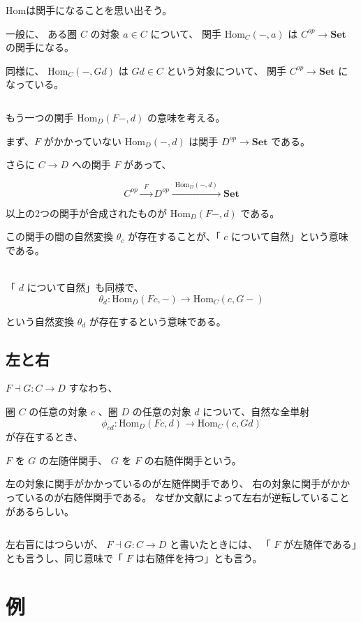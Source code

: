 \documentclass[uplatex,a4j,12pt,dvipdfmx]{jsarticle}
\begin{document}
Homは関手になることを思い出そう。

一般に、
ある圏 $C$ の対象 $a \in C$ について、
関手 $\mathrm{Hom}_{C}(-,a)$ は $C^{op} \to \mathbf{Set}$ の関手になる。

同様に、
$\mathrm{Hom}_{C}(-,Gd)$
は
$Gd \in C$ という対象について、
関手 $C^{op} \to \mathbf{Set}$ になっている。

${}$

もう一つの関手
$\mathrm{Hom}_{D}(F-,d)$
の意味を考える。

まず、$F$ がかかっていない
$\mathrm{Hom}_{D}(-,d)$
は関手
$D^{op} \to \mathbf{Set}$
である。

さらに $C \to D$ への関手 $F$ があって、

$$
	C^{op} \xrightarrow{ \ \ F \ \ } D^{op} \xrightarrow{ \ \ \mathrm{Hom}_{D}(-,d) \ \ } \mathbf{Set}
$$

以上の2つの関手が合成されたものが
$\mathrm{Hom}_{D}(F-,d)$
である。

この関手の間の自然変換 $\theta_{c}$ が存在することが、「 $c$ について自然」という意味である。

\ \\

「 $d$ について自然」も同様で、
$$
	\theta_{d} : \mathrm{Hom}_{D}(Fc,-) \to \mathrm{Hom}_{C}(c,G-)
$$

という自然変換 $\theta_{d}$ が存在するという意味である。


\subsection{左と右}

$F \dashv G : C \to D$ すなわち、

圏 $C$ の任意の対象 $c$ 、圏 $D$ の任意の対象 $d$ について、自然な全単射
$$
	\phi_{cd} : \mathrm{Hom}_{D}(Fc,d) \to \mathrm{Hom}_{C}(c,Gd)
$$
が存在するとき、

$F$ を $G$ の左随伴関手、
$G$ を $F$ の右随伴関手という。

左の対象に関手がかかっているのが左随伴関手であり、
右の対象に関手がかかっているのが右随伴関手である。
なぜか文献によって左右が逆転していることがあるらしい。

${}$

左右盲にはつらいが、
$F \dashv G : C \to D$
と書いたときには、
「 $F$ が左随伴である」とも言うし、同じ意味で「 $F$ は右随伴を持つ」とも言う。

\section{例}
\end{document}
